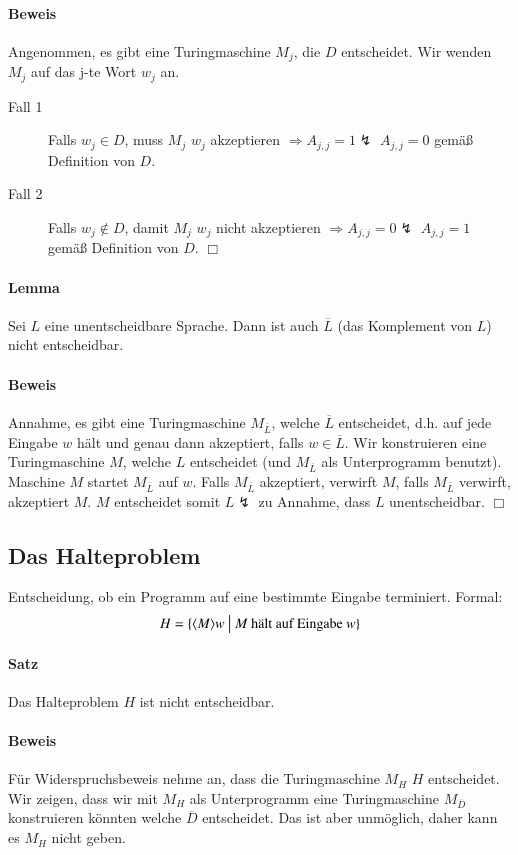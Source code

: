\paragraph*{Beweis} Angenommen, es gibt eine Turingmaschine $M_j$, die $D$ entscheidet. Wir wenden $M_j$ auf das j-te Wort $w_j$ an.
\begin{description}
	\item[Fall 1] Falls $w_j \in D$, muss $M_j$ $w_j$ akzeptieren $\Rightarrow A_{j,j}=1 \lightning$ $A_{j,j}=0$ gemäß Definition von $D$.
	\item[Fall 2] Falls $w_j \not\in D$, damit $M_j$ $w_j$ nicht akzeptieren $\Rightarrow A_{j,j}=0 \lightning$ $A_{j,j}=1$ gemäß Definition von $D$. $\Box$
\end{description}

\paragraph*{Lemma} Sei $L$ eine unentscheidbare Sprache. Dann ist auch $\overline{L}$ (das Komplement von $L$) nicht entscheidbar.

\paragraph*{Beweis} Annahme, es gibt eine Turingmaschine $M_{\overline{L}}$, welche $\overline{L}$ entscheidet, d.h. auf jede Eingabe $w$ hält und genau dann akzeptiert, falls $w \in \overline{L}$. Wir konstruieren eine Turingmaschine $M$, welche $L$ entscheidet (und $M_{\overline{L}}$ als Unterprogramm benutzt). Maschine $M$ startet $M_{\overline{L}}$ auf $w$. Falls $M_{\overline{L}}$ akzeptiert, verwirft $M$, falls $M_{\overline{L}}$ verwirft, akzeptiert $M$. $M$ entscheidet somit $L \lightning$ zu Annahme, dass $L$ unentscheidbar. $\Box$


\subsection{Das Halteproblem}
Entscheidung, ob ein Programm auf eine bestimmte Eingabe terminiert. Formal: $$ H=\{\langle M \rangle w \ \big|\  M \text{ hält auf Eingabe } w \} $$

\paragraph*{Satz} Das Halteproblem $H$ ist nicht entscheidbar.

\paragraph*{Beweis} Für Widerspruchsbeweis nehme an, dass die Turingmaschine $M_H$ $H$ entscheidet. Wir zeigen, dass wir mit $M_H$ als Unterprogramm eine Turingmaschine $M_{\overline{D}}$ konstruieren könnten welche $\overline{D}$ entscheidet. Das ist aber unmöglich, daher kann es $M_H$ nicht geben.

